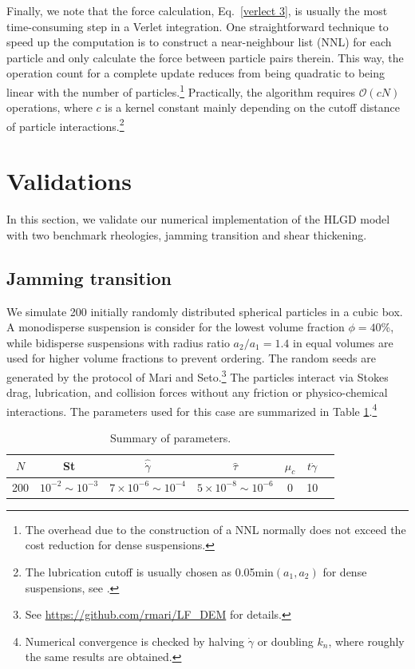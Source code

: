 Finally, we note that the force calculation, Eq.\ \eqref{verlect 3}, is usually the most time-consuming step in a Verlet integration. One straightforward technique to speed up the computation is to construct a near-neighbour list (NNL) for each particle and only calculate the force between particle pairs therein. This way, the operation count for a complete update reduces from being quadratic to being linear with the number of particles.\footnote{The overhead due to the construction of a NNL normally does not exceed the cost reduction for dense suspensions.} Practically, the algorithm requires $\mathcal{O}(cN)$ operations, where $c$ is a kernel constant mainly depending on the cutoff distance of particle interactions.\footnote{The lubrication cutoff is usually chosen as 0.05min$(a_1,a_2)$ for dense suspensions, see \cite{Cheal_Ness_2018}.}


\section{Validations}
\label{valid}

In this section, we validate our numerical implementation of the HLGD model with two benchmark rheologies, \ie jamming transition and shear thickening.

\subsection{Jamming transition}

We simulate 200 initially randomly distributed spherical particles in a cubic box. A monodisperse suspension is consider for the lowest volume fraction $\phi=40$\%, while bidisperse suspensions with radius ratio $a_2/a_1=1.4$ in equal volumes are used for higher volume fractions to prevent ordering. The random seeds are generated by the protocol of Mari and Seto.\footnote{See \url{https://github.com/rmari/LF_DEM} for details.} The particles interact via Stokes drag, lubrication, and collision forces without any friction or physico-chemical interactions. The parameters used for this case are summarized in Table \ref{tab:param}.\footnote{Numerical convergence is checked by halving $\dot{\gamma}$ or doubling $k_n$, where roughly the same results are obtained.}

\begin{table}[h]
  \centering
  \caption{Summary of parameters.}
  \renewcommand{\arraystretch}{1.2}%
  \begin{tabular}{ccccccc}
    \hline
    $N$ & St & $\hat{\dot{\gamma}}$ & $\hat{\tau}$ & $\mu_c$ & $t\dot{\gamma}$\\
    \hline
    200 & $10^{-2}\sim 10^{-3}$ & $7\times 10^{-6}\sim 10^{-4}$ & $5\times 10^{-8}\sim 10^{-6}$  & 0 & 10 \\
    \hline
  \end{tabular}
  \label{tab:param}
\end{table}


